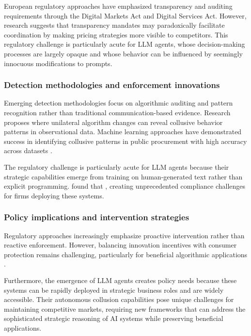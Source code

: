 European regulatory approaches have emphasized transparency and auditing requirements through the Digital Markets Act and Digital Services Act. However, research suggests that transparency mandates may paradoxically facilitate coordination by making pricing strategies more visible to competitors. This regulatory challenge is particularly acute for LLM agents, whose decision-making processes are largely opaque and whose behavior can be influenced by seemingly innocuous modifications to prompts.

\subsubsection*{Detection methodologies and enforcement innovations}

Emerging detection methodologies focus on algorithmic auditing and pattern recognition rather than traditional communication-based evidence. Research proposes  where unilateral algorithm changes can reveal collusive behavior patterns in observational data. Machine learning approaches have demonstrated success in identifying collusive patterns in public procurement with high accuracy across datasets \parencite{wallimann_machine_2023, digital_regulation_cooperation_forum_auditing_2022}.

The regulatory challenge is particularly acute for LLM agents because their strategic capabilities emerge from training on human-generated text rather than explicit programming. \textcite[p.24]{fish_algorithmic_2025} found that , creating unprecedented compliance challenges for firms deploying these systems.

\subsubsection*{Policy implications and intervention strategies}

Regulatory approaches increasingly emphasize proactive intervention rather than reactive enforcement. However, balancing innovation incentives with consumer protection remains challenging, particularly for beneficial algorithmic applications \parencite{digital_regulation_cooperation_forum_auditing_2022}.

Furthermore, the emergence of LLM agents creates policy needs because these systems can be rapidly deployed in strategic business roles and are widely accessible. Their autonomous collusion capabilities pose unique challenges for maintaining competitive markets, requiring new frameworks that can address the sophisticated strategic reasoning of AI systems while preserving beneficial applications.

